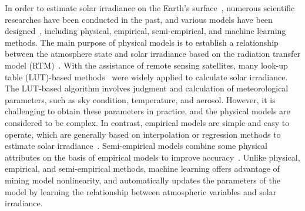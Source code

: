 \documentclass[review]{elsarticle}
\begin{document}
In order to estimate solar irradiance on the Earth's surface~\citep{JIAO2022102802, OLPENDA2019116}, numerous scientific researches have been conducted in the past, and various models have been designed~\citep{CANO198631, PINKER1995108, BEYER1996207, RIGOLLIER2004159, POLO2012275, GUEYMARD2015379, POLO201625, osti_1778700}, including physical, empirical, semi-empirical, and machine learning methods.
The main purpose of physical models is to establish a relationship between the atmosphere state and solar irradiance based on the radiation transfer model (RTM)~\citep{Dedieu1987, DENEKE20083131, AKITSU2022102724}.
With the assistance of remote sensing satellites, many look-up table (LUT)-based methods~\citep{RONGGAOLIU2008998, ZHANG2014318, HE201520, YU2021102380} were widely applied to calculate solar irradiance.
The LUT-based algorithm involves judgment and calculation of meteorological parameters, such as sky condition, temperature, and aerosol.
However, it is challenging to obtain these parameters in practice, and the physical models are considered to be complex.
In contrast, empirical models are simple and easy to operate, which are generally based on interpolation or regression methods to estimate solar irradiance~\citep{XU2016117, URRACA20171098}.
Semi-empirical models combine some physical attributes on the basis of empirical models to improve accuracy~\citep{CHEN2022404}.
Unlike physical, empirical, and semi-empirical methods, machine learning offers advantage of mining model nonlinearity, and automatically updates the parameters of the model by learning the relationship between atmospheric variables and solar irradiance.
\end{document}
